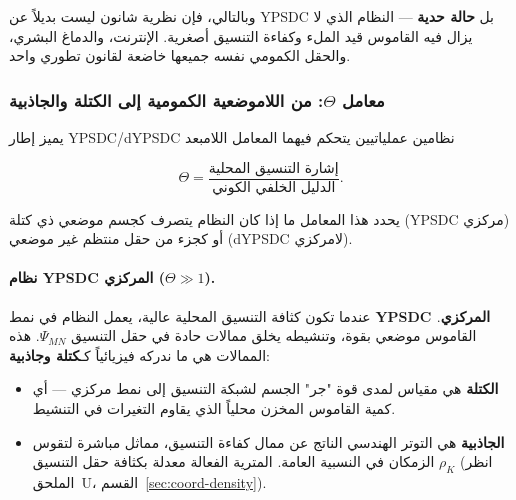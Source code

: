 \documentclass[12pt,a4paper]{article}
\theoremstyle{remark}
\begin{document}
	وبالتالي، فإن نظرية شانون ليست بديلاً عن YPSDC بل \textbf{حالة حدية} — النظام الذي لا يزال فيه القاموس قيد الملء وكفاءة التنسيق أصغرية. الإنترنت، والدماغ البشري، والحقل الكمومي نفسه جميعها خاضعة لقانون تطوري واحد.
	
	\medskip
	
	\subsubsection{معامل \(\Theta\): من اللاموضعية الكمومية إلى الكتلة والجاذبية}
	\label{subsec:theta-mass-gravity}
	
	يميز إطار YPSDC/dYPSDC نظامين عملياتيين يتحكم فيهما المعامل اللامبعد
	
	\begin{equation}
		\Theta = \frac{\text{إشارة التنسيق المحلية}}{\text{الدليل الخلفي الكوني}}.
	\end{equation}
	
	يحدد هذا المعامل ما إذا كان النظام يتصرف كجسم موضعي ذي كتلة (YPSDC مركزي) أو كجزء من حقل منتظم غير موضعي (dYPSDC لامركزي).
	
	\paragraph{نظام YPSDC المركزي (\(\Theta \gg 1\)).}
	عندما تكون كثافة التنسيق المحلية عالية، يعمل النظام في نمط \textbf{YPSDC المركزي}. القاموس موضعي بقوة، وتنشيطه يخلق ممالات حادة في حقل التنسيق \(\Psi_{MN}\). هذه الممالات هي ما ندركه فيزيائياً كـ\textbf{كتلة وجاذبية}:
	
	\begin{itemize}
		\item \textbf{الكتلة} هي مقياس لمدى قوة "جر" الجسم لشبكة التنسيق إلى نمط مركزي — أي كمية القاموس المخزن محلياً الذي يقاوم التغيرات في التنشيط.
		\item \textbf{الجاذبية} هي التوتر الهندسي الناتج عن ممال كفاءة التنسيق، مماثل مباشرة لتقوس الزمكان في النسبية العامة. المترية الفعالة معدلة بكثافة حقل التنسيق \(\rho_K\) (انظر الملحق~U، القسم~\ref{sec:coord-density}).
	\end{itemize}
	
\end{document}
